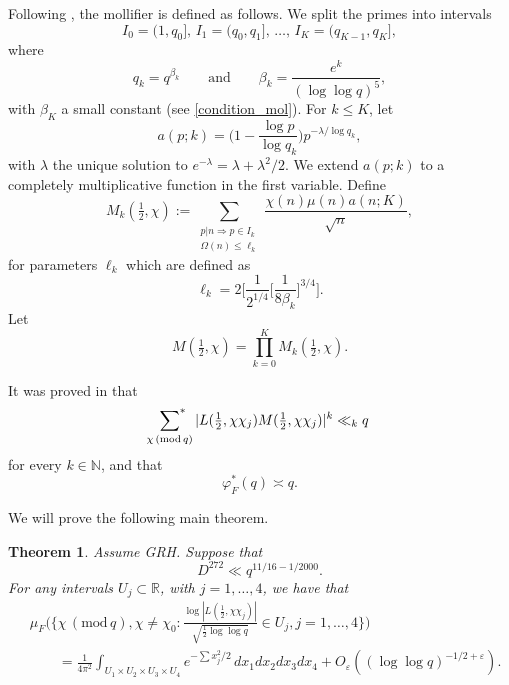 \documentclass[12pt, reqno]{amsart}
\renewcommand{\pmod}[1]{\,(\mathrm{mod}\,#1)}
\newcommand{\acom}[1]{{\color{blue}{Alexandra: #1}} }
\newtheorem{theorem}{Theorem}
\numberwithin{equation}{section}
\numberwithin{theorem}{section}
\numberwithin{equation}{section}
\def\sumstar{\sideset{}{^*}\sum}
\begin{document}
Following \cite{BFM}, the mollifier is defined as follows. We split the primes into intervals
$$I_0= (1, q_0], \, I_1=(q_0, q_1], \,\ldots, \, I_K= (q_{K-1}, q_K],$$ 
where $$q_k=q^{\beta_k}\qquad\text{and}\qquad \beta_k=\frac{e^k}{(\log\log q)^5},$$
with $\beta_K$ a small constant (see \eqref{condition_mol}). For $k \leq K$, let
$$a(p;k) = \Big(1 - \frac{\log p}{ \log q_k} \Big)p^{-\lambda/\log q_k},  $$ with $\lambda$ the unique solution to $e^{-\lambda} = \lambda+\lambda^2/2$.
We extend $a(p;k)$ to a completely multiplicative function in the first variable. %
Define
\begin{equation*}
M_k(\tfrac12,\chi ) := \sum_{\substack{p|n \Rightarrow p \in I_k \\ \Omega(n) \leq \ell_k}} \frac{ \chi(n) \mu(n) a(n;K) }{\sqrt{n}},
\end{equation*} for parameters $\ell_k$ which 
are defined as 
\begin{equation*}
    \ell_k = 2 \Big[ \frac{1}{2^{1/4}} \Big[\frac{1}{8\beta_k}\Big]^{3/4}\Big] .
\end{equation*}
Let
\begin{equation*}
M(\tfrac12,\chi ) = \prod_{k=0}^K M_k(\tfrac12,\chi).
\end{equation*}

It was proved in \cite[Theorem 1.4]{BFM} that
\begin{equation}\label{upperbd}
\sumstar_{\chi \pmod q}|L(\tfrac12,\chi\chi_j)M(\tfrac12,\chi\chi_j)|^k\ll_k q
\end{equation}
for every $k\in\mathbb{N}$, and that
\begin{equation}\label{weight}
\varphi_F^*(q)\asymp q.
\end{equation}

We will prove the following main theorem.
\begin{theorem}
\label{thm:cltjoint}
Assume GRH. Suppose that
\[
D^{272}\ll q^{11/16-1/2000}.
\]
For any intervals $U_j \subset \mathbb R$, with $j=1,\ldots, 4$, we have that
\[
\begin{split}
&\mu_F\Bigg(\bigg\{ \chi \pmod q, \chi\neq \chi_0 : \frac{\log |L(\tfrac12,\chi \chi_j)|}{\sqrt{\tfrac12 \log \log q}} \in U_j, j=1,\ldots, 4\bigg\}\Bigg)
\\
&\qquad = \frac{1}{4\pi^2} \int_{U_1 \times U_2\times U_3\times U_4} e^{-\sum x_j^2/2} \, dx_1dx_2dx_3dx_4+O_{\varepsilon}\left(  (\log \log q)^{-1/2+\varepsilon}\right).
\end{split}
\]
\end{theorem}
\end{document}
